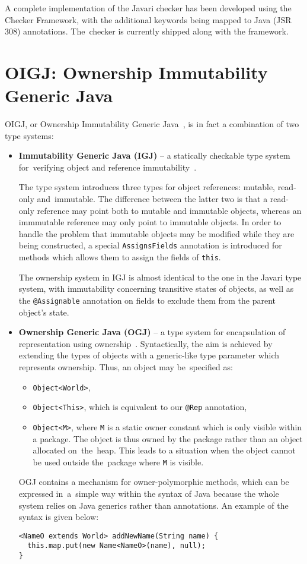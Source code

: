 \documentclass{pracamgr}
\theoremstyle{break}
\theoremstyle{break}
\theoremstyle{break}
\begin{document}
A complete implementation of the Javari checker has been developed
using the Checker Framework, with the additional keywords being
mapped to Java (JSR 308) annotations. The~checker is currently shipped
along with the framework.

\section{OIGJ: Ownership Immutability Generic Java}

OIGJ, or Ownership Immutability Generic Java~\cite{oigj}, is in fact a
combination of two type systems:
\begin{itemize}
\item \textbf{Immutability Generic Java (IGJ)} -- a statically
  checkable type system for~verifying object and reference
  immutability~\cite{igj, enforcing-igj}.
  
  The type system introduces three types for object references:
  mutable, read-only and~immutable. The difference between the latter
  two is that a read-only reference may point both to mutable and
  immutable objects, whereas an immmutable reference may only point to
  immutable objects. In order to handle the problem that immutable
  objects may be modified while they are being constructed, a special
  \texttt{AssignsFields} annotation is introduced for methods which
  allows them to assign the fields of \texttt{this}.

  The ownership system in IGJ is almost identical to the one in the
  Javari type system, with immutability concerning transitive states
  of objects, as well as the \texttt{@Assignable} annotation on fields
  to exclude them from the parent object's state. 
\item \textbf{Ownership Generic Java (OGJ)} -- a type system for
  encapsulation of representation using
  ownership~\cite{ogj}. Syntactically, the aim is achieved by
  extending the types of objects with a generic-like type parameter
  which represents ownership. Thus, an object may be~specified as:
  \begin{itemize}
  \item \texttt{Object<World>},
  \item \texttt{Object<This>}, which is equivalent to our
    \texttt{@Rep} annotation, 
  \item \texttt{Object<M>}, where \texttt{M} is a static owner
    constant which is only visible within a package. The object is
    thus owned by the package rather than an object allocated
    on~the~heap. This leads to a situation when the object cannot be
    used outside the~package where \texttt{M} is visible.
  \end{itemize}

  OGJ contains a mechanism for owner-polymorphic methods, which can be
  expressed in~a~simple way within the syntax of Java because the
  whole system relies on Java generics rather than annotations. An
  example of the syntax is given below:
  \begin{lstlisting}
<NameO extends World> addNewName(String name) {
  this.map.put(new Name<NameO>(name), null);
}
  \end{lstlisting}
\end{itemize}
\end{document}
